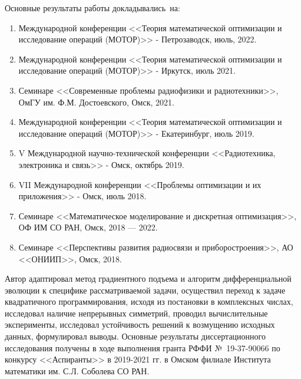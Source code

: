

{\probation}
Основные результаты работы докладывались~на:
\begin{enumerate}[beginpenalty=10000] %
  \item Международной конференции <<Теория математической оптимизации и исследование операций (МОТОР)>> - Петрозаводск, июль, 2022.
  \item Международной конференции <<Теория математической оптимизации и исследование операций (МОТОР)>> -  Иркутск, июль 2021.
  \item Семинаре <<Современные проблемы радиофизики и радиотехники>>, ОмГУ им. Ф.М. Достоевского, Омск, 2021.
  \item Международной конференции <<Теория математической оптимизации и исследование операций (МОТОР)>> - Екатеринбург, июль 2019.
  \item V Международной научно-технической конференции <<Радиотехника, электроника и связь>> - Омск, октябрь 2019.
  \item VII Международной конференции <<Проблемы оптимизации и их приложения>> - Омск, июль 2018.
  \item Семинаре <<Математическое моделирование и дискретная оптимизация>>, ОФ ИМ СО РАН, Омск, 2018 --- 2022.
  \item Семинаре <<Перспективы развития радиосвязи и приборостроения>>, АО <<ОНИИП>>, Омск, 2018.
\end{enumerate}

{\contribution} Автор адаптировал метод градиентного подъема и алгоритм дифференциальной эволюции к специфике рассматриваемой задачи, осуществил переход к задаче квадратичного программирования, исходя из постановки в комплексных числах, исследовал наличие непрерывных симметрий, проводил вычислительные эксперименты, исследовал устойчивость решений к возмущению исходных данных, формулировал выводы.
Основные результаты диссертационного исследования получены в ходе выполнения гранта РФФИ №~19-37-90066 по конкурсу <<Аспиранты>> в 2019-2021 гг. в Омском филиале Института математики им. С.Л. Соболева СО РАН.

